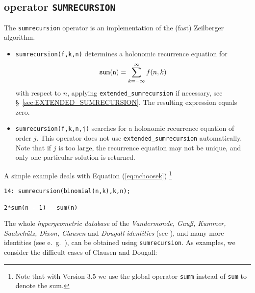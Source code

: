 \subsection{\REDUCE{} operator {\tt SUMRECURSION}}

The {\tt sumrecursion} operator is an implementation of the (fast)
Zeilberger algorithm.
\begin{itemize}
\item
{\tt sumrecursion(f,k,n)} determines a holonomic recurrence equation
for 
\[
{\tt sum(n)} =\sum\limits_{k=-\infty}^\infty f(n,k)
\]
with respect to $n$, applying
{\tt extended\_sumrecursion} if necessary, 
see \S~\ref{sec:EXTENDED_SUMRECURSION}.
The resulting expression equals zero.
\item
{\tt sumrecursion(f,k,n,j)} %
searches for a holonomic recurrence equation of order $j$. This 
operator does not use {\tt extended\_sumrecursion} automatically.
Note that if $j$ is too large, the recurrence equation
may not be unique, and only one particular solution is returned.
\end{itemize}
A simple example deals with Equation (\ref{eq:nchoosek})%
\footnote{Note that with \REDUCE{} Version 3.5 we use the global operator 
{\tt summ} instead of {\tt sum} to denote the sum.} 

{\small
\begin{verbatim}
14: sumrecursion(binomial(n,k),k,n);

2*sum(n - 1) - sum(n)
\end{verbatim}
}\noindent
The whole {\sl hypergeometric database} of the {\sl
Vandermonde, Gau{\ss}, Kummer, Saalsch\"utz, Dixon, Clausen} and {\sl Dougall
identities} (see \cite{Wilf}), and many more identities (see e.\ g.\
\cite{Koepf}), can be obtained using {\tt sumrecursion}. 
As examples, we consider the difficult cases of Clausen and Dougall:%


